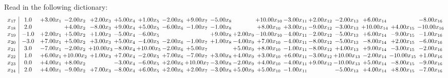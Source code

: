 \documentclass[9pt]{article}
\begin{document}
Read in the following dictionary:
\[\begin{array}{c| c c@{\hskip 2pt} c@{\hskip 2pt} c@{\hskip 2pt} c@{\hskip 2pt} c@{\hskip 2pt} c@{\hskip 2pt} c@{\hskip 2pt} c@{\hskip 2pt} c@{\hskip 2pt} c@{\hskip 2pt} c@{\hskip 2pt} c@{\hskip 2pt} c@{\hskip 2pt} c@{\hskip 2pt} c@{\hskip 2pt} c@{\hskip 2pt} }
 x_{17}   &  1.0 & +  3.00 x_{1} & -2.00 x_{2} & +  2.00 x_{3} & +  5.00 x_{4} & +  1.00 x_{5} & -2.00 x_{6} & +  9.00 x_{7} & -5.00 x_{8} &   & + 10.00 x_{10} & -3.00 x_{11} & +  2.00 x_{12} & -2.00 x_{13} & +  6.00 x_{14} &   & -8.00 x_{16}\\
 x_{18}   &  2.0  &   & +  4.00 x_{2} & -8.00 x_{3} & +  9.00 x_{4} & +  5.00 x_{5} & -6.00 x_{6} & -1.00 x_{7} & -1.00 x_{8} &   & +  8.00 x_{10} & +  3.00 x_{11} & -9.00 x_{12} & -3.00 x_{13} & + 10.00 x_{14} & +  4.00 x_{15} & -10.00 x_{16}\\
 x_{19}   &  -1.0 & +  2.00 x_{1} & +  5.00 x_{2} & +  1.00 x_{3} & -5.00 x_{4} & -6.00 x_{5} &    &   & +  9.00 x_{8} & +  2.00 x_{9} & -10.00 x_{10} & -4.00 x_{11} & -2.00 x_{12} & -5.00 x_{13} & +  6.00 x_{14} & -9.00 x_{15} & -1.00 x_{16}\\
 x_{20}   &  -3.0 & +  7.00 x_{1} & +  5.00 x_{2} & +  3.00 x_{3} & +  5.00 x_{4} & -4.00 x_{5} & -2.00 x_{6} & -1.00 x_{7} & +  1.00 x_{8} & -4.00 x_{9} & +  7.00 x_{10} & -4.00 x_{11} & -8.00 x_{12} & -5.00 x_{13} & -8.00 x_{14} & +  2.00 x_{15} & -6.00 x_{16}\\
 x_{21}   &  3.0 & -7.00 x_{1} & -2.00 x_{2} & + 10.00 x_{3} & -8.00 x_{4} & + 10.00 x_{5} & -2.00 x_{6} & +  5.00 x_{7} &   & +  5.00 x_{9} & +  8.00 x_{10} & -1.00 x_{11} & -8.00 x_{12} & +  4.00 x_{13} & +  9.00 x_{14} & -3.00 x_{15} & -2.00 x_{16}\\
 x_{22}   &  1.0 & +  6.00 x_{1} & + 10.00 x_{2} & +  1.00 x_{3} & +  7.00 x_{4} & -2.00 x_{5} & +  7.00 x_{6} & -7.00 x_{7} & +  3.00 x_{8} & +  4.00 x_{9} & +  3.00 x_{10} & +  6.00 x_{11} & -3.00 x_{12} & + 10.00 x_{13} & -2.00 x_{14} & -10.00 x_{15} & +  1.00 x_{16}\\
 x_{23}   &  0.0 & +  4.00 x_{1} & +  8.00 x_{2} &   & -3.00 x_{4} & -6.00 x_{5} & +  2.00 x_{6} & + 10.00 x_{7} & -3.00 x_{8} & -2.00 x_{9} & +  4.00 x_{10} & -4.00 x_{11} & +  9.00 x_{12} & -10.00 x_{13} & +  5.00 x_{14} & -8.00 x_{15} & -9.00 x_{16}\\
 x_{24}   &  2.0 & +  4.00 x_{1} & -9.00 x_{2} & +  7.00 x_{3} & -8.00 x_{4} & +  6.00 x_{5} & +  2.00 x_{6} & +  2.00 x_{7} & -3.00 x_{8} & +  5.00 x_{9} & +  5.00 x_{10} & -1.00 x_{11} &   & -5.00 x_{13} & +  4.00 x_{14} & +  8.00 x_{15} & -7.00 x_{16}\\

\end{array}\]
\end{document}
